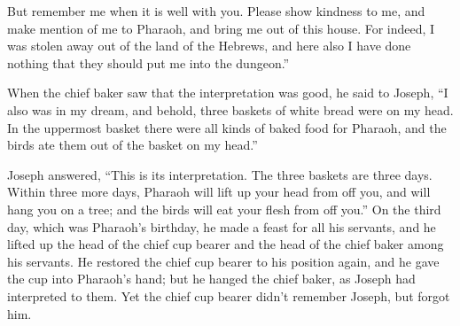 {But remember me when it is well with you. Please show kindness to me, and make mention of me to Pharaoh, and bring me out of this house.
For indeed, I was stolen away out of the land of the Hebrews, and here also I have done nothing that they should put me into the dungeon.”
\par }{\PP {}When the chief baker saw that the interpretation was good, he said to Joseph, “I also was in my dream, and behold, three baskets of white bread were on my head.
In the uppermost basket there were all kinds of baked food for Pharaoh, and the birds ate them out of the basket on my head.”
\par }{\PP {}Joseph answered, “This is its interpretation. The three baskets are three days.
Within three more days, Pharaoh will lift up your head from off you, and will hang you on a tree; and the birds will eat your flesh from off you.”
On the third day, which was Pharaoh’s birthday, he made a feast for all his servants, and he lifted up the head of the chief cup bearer and the head of the chief baker among his servants.
He restored the chief cup bearer to his position again, and he gave the cup into Pharaoh’s hand;
but he hanged the chief baker, as Joseph had interpreted to them.
Yet the chief cup bearer didn’t remember Joseph, but forgot him.

}
